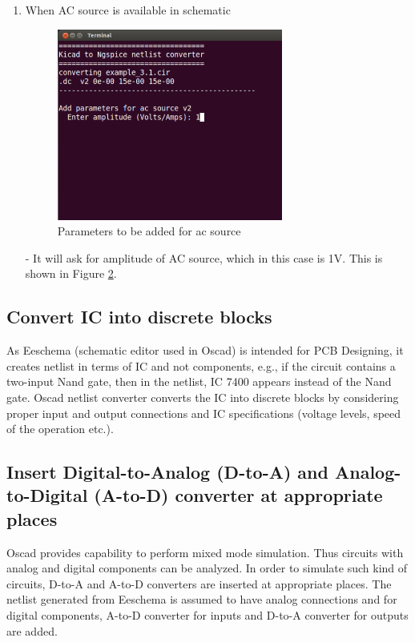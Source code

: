 \begin{enumerate}
\begin{figure}[t]
\caption{Parameters to be added for dc source}
\label{9}
\end{figure}
- It will ask for the value of DC source. In the example shown in Figure \ref{9}, the value of DC source is 10V.
\item When AC source is available in schematic
\begin{figure}[t]
\centering
\includegraphics[width=0.7\textwidth]{figures/10}
\caption{Parameters to be added for ac source}
\label{10}
\end{figure}
- It will ask for amplitude of AC source, which in this case is 1V. This is shown in Figure \ref{10}.
\end{enumerate}
\subsection{Convert IC into discrete blocks}
As Eeschema (schematic editor used in Oscad) is intended for PCB Designing, it creates netlist in terms of IC and not components, e.g., if the circuit contains a two-input Nand gate, then in the netlist, IC 7400 appears instead of the Nand gate. Oscad netlist converter converts the IC into discrete blocks by considering proper input and output connections and IC specifications (voltage levels, speed of the operation etc.). 
\subsection{Insert Digital-to-Analog (D-to-A) and Analog-to-Digital (A-to-D) converter at appropriate places}
Oscad provides capability to perform mixed mode simulation. Thus circuits with analog and digital components can be analyzed. In order to simulate such kind of circuits, D-to-A and A-to-D converters are inserted at appropriate places. The netlist generated from Eeschema is assumed to have analog connections and for digital components, A-to-D converter for inputs and D-to-A converter for outputs are added.
